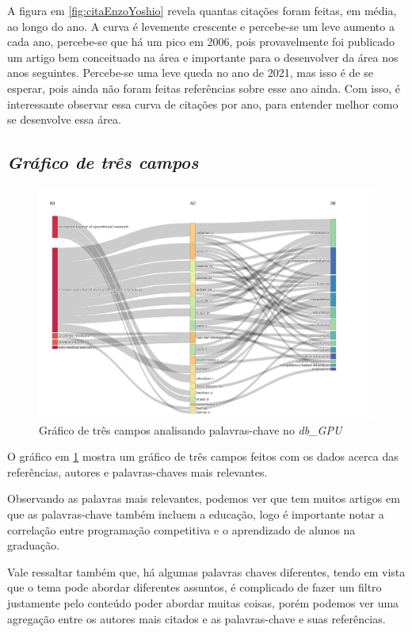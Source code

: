 A figura em \ref{fig:citaEnzoYoshio} revela quantas citações foram feitas, em média, ao longo do ano. A curva é levemente crescente e percebe-se um leve aumento a cada ano, percebe-se que há um pico em 2006, pois provavelmente foi publicado um artigo bem conceituado na área e importante para o desenvolver da área nos anos seguintes. Percebe-se uma leve queda no ano de 2021, mas isso é de se esperar, pois ainda não foram feitas referências sobre esse ano ainda. Com isso, é interessante observar essa curva de citações por ano, para entender melhor como se desenvolve essa área.

\subsection{\textit{Gráfico de três campos}}

\begin{figure}[ht]
    \centering
    \includegraphics[width=12cm]{experiments/enzoyoshio/AnaliseBibliometrica/threeFieldsPlot.png}
    \caption{Gráfico de três campos analisando palavras-chave no \textit{db\_GPU}}
    \label{fig:threeFieldEnzoY}
\end{figure}

O gráfico em \ref{fig:threeFieldEnzoY} mostra um gráfico de três campos feitos com os dados acerca das referências, autores e palavras-chaves mais relevantes.

Observando as palavras mais relevantes, podemos ver que tem muitos artigos em que as palavras-chave também incluem a educação, logo é importante notar a correlação entre programação competitiva e o aprendizado de alunos na graduação.

Vale ressaltar também que, há algumas palavras chaves diferentes, tendo em vista que o tema pode abordar diferentes assuntos, é complicado de fazer um filtro justamente pelo conteúdo poder abordar muitas coisas, porém podemos ver uma agregação entre os autores mais citados e as palavras-chave e suas referências.